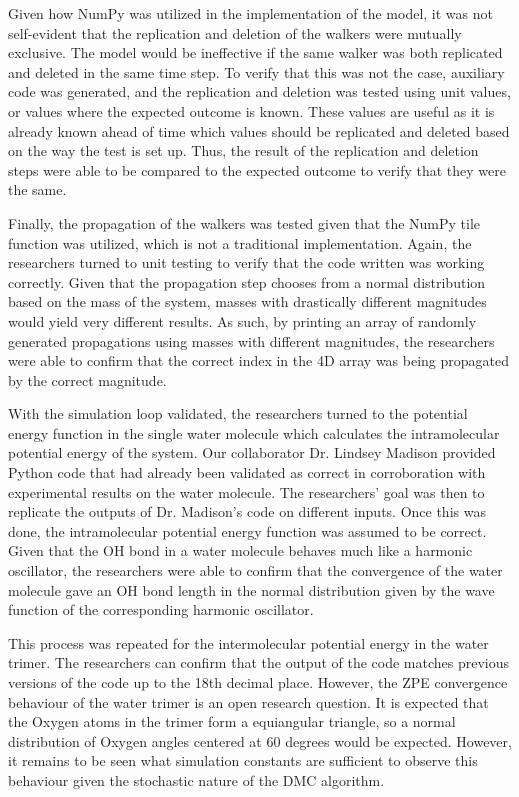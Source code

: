 \documentclass[journal=jacsat,manuscript=article]{achemso}
\begin{document}
Given how NumPy was utilized in the implementation of the model, it was not self-evident that the replication and deletion of the walkers were mutually exclusive. The model would be ineffective if the same walker was both replicated and deleted in the same time step. To verify that this was not the case, auxiliary code was generated, and the replication and deletion was tested using unit values, or values where the expected outcome is known. These values are useful as it is already known ahead of time which values should be replicated and deleted based on the way the test is set up. Thus, the result of the replication and deletion steps were able to be compared to the expected outcome to verify that they were the same.

Finally, the propagation of the walkers was tested given that the NumPy tile function was utilized, which is not a traditional implementation. Again, the researchers turned to unit testing to verify that the code written was working correctly. Given that the propagation step chooses from a normal distribution based on the mass of the system, masses with drastically different magnitudes would yield very different results. As such, by printing an array of randomly generated propagations using masses with different magnitudes, the researchers were able to confirm that the correct index in the 4D array was being propagated by the correct magnitude. 

With the simulation loop validated, the researchers turned to the potential energy function in the single water molecule which calculates the intramolecular potential energy of the system. Our collaborator Dr. Lindsey Madison provided Python code that had already been validated as correct in corroboration with experimental results\cite{Stillinger1975} on the water molecule. The researchers’ goal was then to replicate the outputs of Dr. Madison’s code on different inputs. Once this was done, the intramolecular potential energy function was assumed to be correct. Given that the OH bond in a water molecule behaves much like a harmonic oscillator, the researchers were able to confirm that the convergence of the water molecule gave an OH bond length in the normal distribution given by the wave function of the corresponding harmonic oscillator. 

This process was repeated for the intermolecular potential energy in the water trimer. The researchers can confirm that the output of the code matches previous versions of the code up to the 18th decimal place. However, the ZPE convergence behaviour of the water trimer is an open research question. It is expected that the Oxygen atoms in the trimer form a equiangular triangle, so a normal distribution of Oxygen angles centered at 60 degrees would be expected. However, it remains to be seen what simulation constants are sufficient to observe this behaviour given the stochastic nature of the DMC algorithm.
\end{document}
